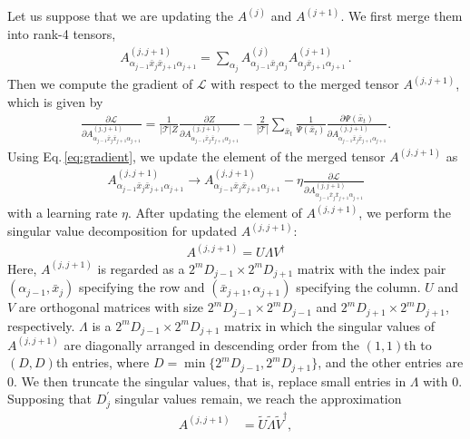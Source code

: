 {Let us suppose that we are updating the $A^{(j)}$ and $A^{(j+1)}$.
We first merge them into rank-4 tensors, 
\begin{align}
    A^{(j,j+1)}_{\alpha_{j-1} \bar x_{j} \bar x_{j+1} \alpha_{j+1}} = \sum_{\alpha_j} A^{(j)}_{\alpha_{j-1} \bar x_{j} \alpha_j} A^{(j+1)}_{\alpha_{j} \bar x_{j+1} \alpha_{j+1}} \, . 
\end{align}
Then we compute the gradient of $\mathcal{L}$ with respect to the merged tensor $A^{(j,j+1)}$, which is given by 
\begin{align}
    \frac{\partial \mathcal{L}}{\partial A^{(j,j+1)}_{\alpha_{j-1} \bar x_{j} \bar x_{j+1} \alpha_{j+1}}} = \frac{1}{|\mathcal{T}|Z}\frac{\partial Z}{\partial A^{(j,j+1)}_{\alpha_{j-1} \bar x_{j} \bar x_{j+1} \alpha_{j+1}}} - \frac{2}{|\mathcal{T}|} \sum_{\bar x_t} \frac{1}{\Psi (\bar x_t)}\frac{\partial \Psi (\bar x_t)}{\partial A^{(j,j+1)}_{\alpha_{j-1} \bar x_{j} \bar x_{j+1} \alpha_{j+1}}}.
    \label{eq:gradient}
\end{align} 
Using Eq.\,\eqref{eq:gradient}, we update the element of the merged tensor $A^{(j,j+1)}$ as 
\begin{align}
    A^{(j,j+1)}_{\alpha_{j-1} \bar x_{j} \bar x_{j+1} \alpha_{j+1}} \rightarrow  A^{(j,j+1)}_{\alpha_{j-1} \bar x_{j} \bar x_{j+1} \alpha_{j+1}} - \eta \frac{\partial\mathcal{L}}{\partial A^{(j,j+1)}_{\alpha_{j-1} \bar x_{j} \bar x_{j+1} \alpha_{j+1}}}
\end{align}
with a learning rate $\eta$.
After updating the element of $A^{(j,j+1)}$, we perform the singular value decomposition for updated $A^{(j,j+1)}$:
\begin{align}
    A^{(j,j+1)} = U \Lambda V^\dagger
\end{align}
Here, $A^{(j,j+1)}$ is regarded as a $2^mD_{j-1}\times2^mD_{j+1}$ matrix with the index pair $(\alpha_{j-1},\bar x_{j})$ specifying the row and $(\bar x_{j+1},\alpha_{j+1})$ specifying the column.
$U$ and $V$ are orthogonal matrices with size $2^mD_{j-1}\times2^mD_{j-1}$ and $2^mD_{j+1}\times2^mD_{j+1}$, respectively.
$\Lambda$ is a $2^mD_{j-1} \times 2^mD_{j+1}$ matrix in which the singular values of $A^{(j,j+1)}$ are diagonally arranged in descending order from the $(1,1)$th to $(D,D)$th entries, where $D=\min\{2^mD_{j-1},2^mD_{j+1}\}$, and the other entries are 0.
We then truncate the singular values, that is, replace small entries in $\Lambda$ with 0.
Supposing that $D_j^\prime$ singular values remain, we reach the approximation
\begin{align}
    A^{(j,j+1)} &= \tilde{U} \tilde{\Lambda} \tilde{V}^\dagger,

\end{align}}
